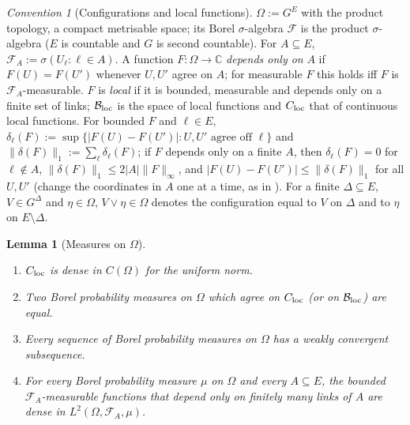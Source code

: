 \documentclass[11pt,a4paper]{article}
\newtheorem{lemma}[theorem]{Lemma}
\theoremstyle{definition}
\theoremstyle{remark}
\newtheorem{convention}[theorem]{Convention}
\newcommand{\C}{\mathbb{C}}
\newcommand{\cB}{\mathcal{B}}
\newcommand{\cF}{\mathcal{F}}
\newcommand{\norm}[1]{\lVert #1\rVert}
\newcommand{\Flab}[2]{\cite[#1 \texttt{#2}]{F}}
\begin{document}
\begin{convention}[Configurations and local functions]\label{iv:conv:config}
$\Omega:=G^E$ with the product topology, a compact metrisable space; its Borel $\sigma$-algebra $\cF$ is the product
$\sigma$-algebra ($E$ is countable and $G$ is second countable). For $A\subseteq E$, $\cF_A:=\sigma(U_\ell:\ell\in A)$. A
function $F:\Omega\to\C$ \emph{depends only on} $A$ if $F(U)=F(U')$ whenever $U,U'$ agree on $A$; for measurable $F$ this
holds iff $F$ is $\cF_A$-measurable. $F$ is \emph{local} if it is bounded, measurable and depends only on a finite set of
links; $\cB_{\rm loc}$ is the space of local functions and $C_{\rm loc}$ that of continuous local functions. For bounded
$F$ and $\ell\in E$, $\delta_\ell(F):=\sup\{|F(U)-F(U')|:U,U'\text{ agree off }\ell\}$ and
$\norm{\delta(F)}_1:=\sum_\ell\delta_\ell(F)$; if $F$ depends only on a finite $A$, then $\delta_\ell(F)=0$ for
$\ell\notin A$, $\norm{\delta(F)}_1\le2|A|\norm F_\infty$, and $|F(U)-F(U')|\le\norm{\delta(F)}_1$ for all $U,U'$ (change
the coordinates in $A$ one at a time, as in \Flab{eq.}{eq:interp}). For a finite $\Delta\subseteq E$, $V\in G^\Delta$ and
$\eta\in\Omega$, $V\vee\eta\in\Omega$ denotes the configuration equal to $V$ on $\Delta$ and to $\eta$ on $E\setminus\Delta$.
\end{convention}

\begin{lemma}[Measures on $\Omega$]\label{iv:lem:measures}
\begin{enumerate}[label=(\roman*)]
\item $C_{\rm loc}$ is dense in $C(\Omega)$ for the uniform norm.
\item Two Borel probability measures on $\Omega$ which agree on $C_{\rm loc}$ (or on $\cB_{\rm loc}$) are equal.
\item Every sequence of Borel probability measures on $\Omega$ has a weakly convergent subsequence.
\item For every Borel probability measure $\mu$ on $\Omega$ and every $A\subseteq E$, the bounded $\cF_A$-measurable functions
that depend only on finitely many links of $A$ are dense in $L^2(\Omega,\cF_A,\mu)$.
\end{enumerate}
\end{lemma}
\end{document}
